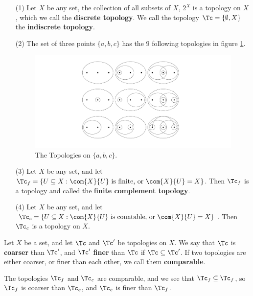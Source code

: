 \begin{example}
    \begin{enumerate}
        \item[(1)] Let $X$ be any set, the collection of all subsets of  $X$,  $2^X$ is a topology
            on $X$, which we call the \textbf{discrete topology}. We call the topology  $\Tc=
            \{\emptyset, X\}$ the \textbf{indiscrete topology}.

        \item[(2)] The set of three points $\{a, b, c\}$ has the  $9$ following topologies
            in figure \ref{fig1.1}.
            \begin{figure}[h]
                \centering
                \includegraphics[scale = 0.3]{Figures/Chapter1/topologiesOn3Points.png}
                \caption{The Topologies on $\{a, b, c\}$.}
                \label{fig1.1}
            \end{figure}

        \item[(3)] Let $X$ be any set, and let  $\Tc_f=\{U \subseteq X: \com{X}{U} \text{ is
            finite, or } \com{X}{U}=X\}$. Then  $\Tc_f$ is a topology and called the
            \textbf{finite complement topology}.

        \item[(4)] Let $X$ be any set, and let  $\Tc_c=\{U \subseteq X: \com{X}{U} \text{ is
            countable, or } \com{X}{U}=X\}$. Then  $\Tc_c$ is a topology on $X$.
    \end{enumerate}
\end{example}

\begin{definition}
    Let $X$ be a set, and let $\Tc$ and  $\Tc'$ be topologies on  $X$. We say that
    $\Tc$ is  \textbf{coarser} than $\Tc'$, and $\Tc'$ \textbf{finer} than $\Tc$ if  $\Tc \subseteq \Tc'$.
    If two topologies are either coarser, or finer than each other, we call them \textbf{comparable}.
\end{definition}

\begin{example}
    The topologies $\Tc_f$ and  $\Tc_c$ are comparable, and we see that  $\Tc_f \subseteq \Tc_f$, so
    $\Tc_f$ is coarser than  $\Tc_c$, and  $\Tc_c$ is finer than  $\Tc_f$.
\end{example}

